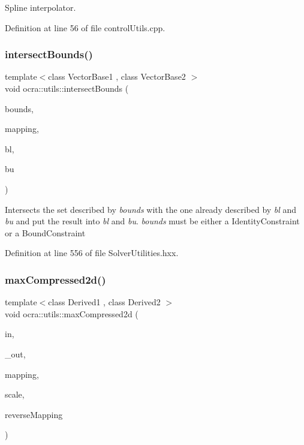 Spline interpolator. 

Definition at line 56 of file control\+Utils.\+cpp.

\hypertarget{namespaceocra_1_1utils_aa835270370ca3a7f7b9e2858ef37dae0}{}\label{namespaceocra_1_1utils_aa835270370ca3a7f7b9e2858ef37dae0} 
\subsubsection{\texorpdfstring{intersect\+Bounds()}{intersectBounds()}}
{\footnotesize\ttfamily template$<$class Vector\+Base1 , class Vector\+Base2 $>$ \\
void ocra\+::utils\+::intersect\+Bounds (\begin{DoxyParamCaption}\item[{const \hyperlink{namespaceocra_ab310e2c53f5e52ec3aba0a832f7dc79e}{Diagonal\+Linear\+Constraint} \&}]{bounds,  }\item[{const std\+::vector$<$ int $>$ \&}]{mapping,  }\item[{Vector\+Base1 \&}]{bl,  }\item[{Vector\+Base2 \&}]{bu }\end{DoxyParamCaption})\hspace{0.3cm}{\ttfamily [inline]}}

Intersects the set described by {\itshape bounds} with the one already described by {\itshape bl} and {\itshape bu} and put the result into {\itshape bl} and {\itshape bu}. {\itshape bounds} must be either a Identity\+Constraint or a Bound\+Constraint 

Definition at line 556 of file Solver\+Utilities.\+hxx.

\hypertarget{namespaceocra_1_1utils_ac4a24bd4a452b6c09129dcf5b7f620a2}{}\label{namespaceocra_1_1utils_ac4a24bd4a452b6c09129dcf5b7f620a2} 
\subsubsection{\texorpdfstring{max\+Compressed2d()}{maxCompressed2d()}\hspace{0.1cm}{\footnotesize\ttfamily [1/2]}}
{\footnotesize\ttfamily template$<$class Derived1 , class Derived2 $>$ \\
void ocra\+::utils\+::max\+Compressed2d (\begin{DoxyParamCaption}\item[{const Matrix\+Base$<$ Derived1 $>$ \&}]{in,  }\item[{Matrix\+Base$<$ Derived2 $>$ const \&}]{\+\_\+out,  }\item[{const std\+::vector$<$ int $>$ \&}]{mapping,  }\item[{double}]{scale,  }\item[{bool}]{reverse\+Mapping }\end{DoxyParamCaption})\hspace{0.3cm}{\ttfamily [inline]}}



